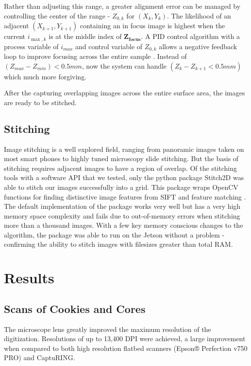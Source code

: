 \documentclass[a4paper,12pt]{article}
\begin{document}
Rather than adjusting this range, a greater alignment error can be managed by controlling the center of the range - $Z_{0,k}$ for $(X_k,Y_k)$. 
The likelihood of an adjacent $(X_{k+1}, Y_{k+1})$ containing an in focus image is highest when the current $i_{{\max,k}}$ is at the middle index of $\boldsymbol{Z_{focus}}$. 
A PID control algorithm with a process variable of $i_{max}$ and control variable of $Z_{0,k}$ allows a negative feedback loop to improve focusing across the entire sample \citep{odwyer_summary_2000}. 
Instead of $(Z_{max} - Z_{min}) < 0.5mm$, now the system can handle $(Z_{k} - Z_{k+1} < 0.5mm)$ which much more forgiving. 

After the capturing overlapping images across the entire surface area, the images are ready to be stitched.

\subsection{Stitching}

Image stitching is a well explored field, ranging from panoramic images taken on most smart phones to highly tuned microscopy slide stitching. 
But the basis of stitching requires adjacent images to have a region of overlap. 
Of the stitching tools with a software API that we tested, only the python package Stitch2D was able to stitch our images successfully into a grid. %
This package wraps OpenCV functions for finding distinctive image features from SIFT and feature matching \citep{lowe_distinctive_2004}. 
The default implementation of the package works very well but has a very high memory space complexity and fails due to out-of-memory errors when stitching more than a thousand images. %
With a few key memory conscious changes to the algorithm, the package was able to run on the Jetson without a problem - confirming the ability to stitch images with filesizes greater than total RAM. 

\section{Results}
\subsection{Scans of Cookies and Cores}
The microscope lens greatly improved the maximum resolution of the digitization. Resolutions of up to 13,400 DPI were achieved, a large improvement when compared to 
both high resolution flatbed scanners (Epson® Perfection v750 PRO) and CaptuRING. 
\end{document}

